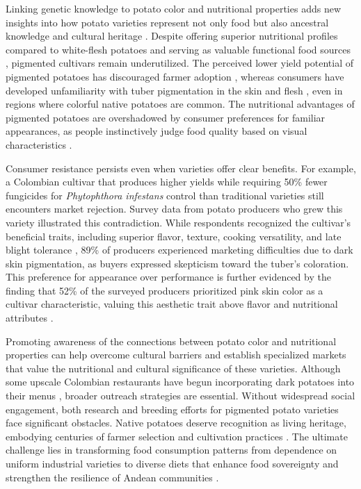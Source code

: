\documentclass[pdflatex,sn-mathphys-ay]{sn-jnl}%
\begin{document}
Linking genetic knowledge to potato color and nutritional properties adds new insights into how potato varieties represent not only food but also ancestral knowledge and cultural heritage \citep{galvis2022cultural}. Despite offering superior nutritional profiles compared to white-flesh potatoes and serving as valuable functional food sources \citep{kumar2024anthocyanin}, pigmented cultivars remain underutilized. The perceived lower yield potential of pigmented potatoes has discouraged farmer adoption \citep{witbooi2021role}, whereas consumers have developed unfamiliarity with tuber pigmentation in the skin and flesh \citep{paakki2016consumer}, even in regions where colorful native potatoes are common. The nutritional advantages of pigmented potatoes are overshadowed by consumer preferences for familiar appearances, as people instinctively judge food quality based on visual characteristics \citep{derndorfer2017colours}.

Consumer resistance persists even when varieties offer clear benefits. For example, a Colombian cultivar that produces higher yields while requiring 50\% fewer fungicides for \textit{Phytophthora infestans} control than traditional varieties still encounters market rejection. Survey data from potato producers who grew this variety illustrated this contradiction. While respondents recognized the cultivar's beneficial traits, including superior flavor, texture, cooking versatility, and late blight tolerance \citep{sanchez2021plan}, 89\% of producers experienced marketing difficulties due to dark skin pigmentation, as buyers expressed skepticism toward the tuber's coloration. This preference for appearance over performance is further evidenced by the finding that 52\% of the surveyed producers prioritized pink skin color as a cultivar characteristic, valuing this aesthetic trait above flavor and nutritional attributes \citep{rodriguez2023estrategia}.

Promoting awareness of the connections between potato color and nutritional properties can help overcome cultural barriers and establish specialized markets that value the nutritional and cultural significance of these varieties. Although some upscale Colombian restaurants have begun incorporating dark potatoes into their menus \citep{RadioNacional2022}, broader outreach strategies are essential. Without widespread social engagement, both research and breeding efforts for pigmented potato varieties face significant obstacles. Native potatoes deserve recognition as living heritage, embodying centuries of farmer selection and cultivation practices \citep{arcespatial,luttringhaus2021dynamic}. The ultimate challenge lies in transforming food consumption patterns from dependence on uniform industrial varieties to diverse diets that enhance food sovereignty and strengthen the resilience of Andean communities \citep{dawson2023identifying}.
\end{document}
